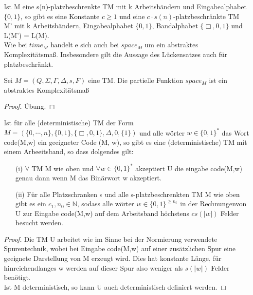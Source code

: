     Ist M eine s(n)-platzbeschrenkte TM mit k Arbeitsbändern und Eingabealphabet \(\{0, 1\}\), so gibt es eine Konstante \(c \geq 1\) und eine \(c \cdot s(n)\)-platzbeschränkte TM M' mit k Arbeitsbändern, Eingabealphabet \(\{0, 1\}\), Bandalphabet \(\{\Box, 0, 1\}\) und L(M') = L(M).
    \vspace*{0.5cm}
    \\
    Wie bei \(time_M\) handelt e sich auch bei \(space_M\) um ein abstraktes Komplexitätsmaß. Insbesondere gilt die Aussage des Lückensatzes auch für platzbeschränkt.

    Sei \(M = (Q, \Sigma, \Gamma, \Delta, s, F)\) eine TM. Die partielle Funktion \(space_M\) ist ein abstraktes Komplexitätsmaß
    \begin{proof}
        Übung.
    \end{proof}

    Ist für alle (deterministische) TM der Form \(M = (\{0, \cdots, n\}, \{0, 1\}, \{\Box, 0, 1\}, \Delta, 0, \{1\})\) und alle wörter \(w \in \{0, 1\}^*\) das Wort code(M,w) ein geeigneter Code (M, w), so gibt es eine (deterministische) TM mit einem Arbeeitsband, so dass dolgendes gilt:
    \begin{itemize}
        \item [(i)] \(\forall\) TM M wie oben und \(\forall w \in \{0, 1\}^*\) akzeptiert U die eingabe code(M,w) genau dann wenn M das Binärwort w akzeptiert.
        \item [(ii)] Für alle Platzschranken s und alle s-platzbeschrenkten TM M wie oben gibt es ein \(c_1, n_0 \in \mathbb{N}\), sodass alle wörter \(w \in \{0, 1\}^{\geq n_0}\) in der Rechnungenvon U zur Eingabe code(M,w) auf dem Arbeitsband höchstens \(cs(|w|)\) Felder besucht werden.
    \end{itemize} 
    \begin{proof}
        Die TM U arbeitet wie im Sinne bei der Normierung verwendete Spurentechnik, wobei bei Eingabe code(M,w) auf einer zusätzlichen Spur eine geeignete Darstellung von M erzeugt wird. Dies hat konstante Länge, für hinreichendlanges w werden auf dieser Spur also weniger als \(s(|w|)\) Felder benötigt.
        \vspace*{0.5cm}
        \\
        Ist M deterministisch, so kann U auch deterministisch definiert werden.
    \end{proof}


